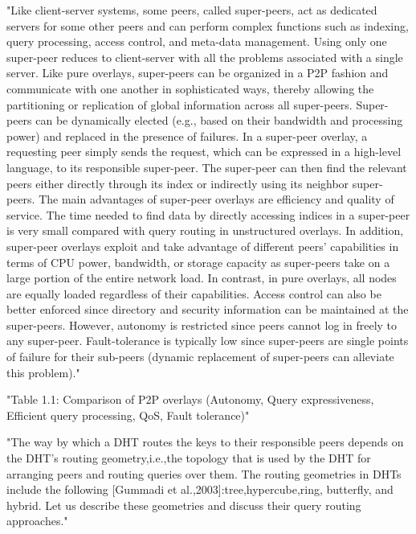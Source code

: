 "Like client-server systems, some peers, called super-peers, act as dedicated servers for some other peers and can perform complex functions such as indexing, query processing, access control, and meta-data management.
Using only one super-peer reduces to client-server with all the problems associated with a single server.
Like pure overlays, super-peers can be organized in a P2P fashion and communicate with one another in sophisticated ways, thereby allowing the partitioning or replication of global information across all super-peers.
Super-peers can be dynamically elected (e.g., based on their bandwidth and processing power) and replaced in the
presence of failures.
In a super-peer overlay, a requesting peer simply sends the request, which can be expressed in a high-level language, to its responsible super-peer.
The super-peer can then find the relevant peers either directly through its index or indirectly using its neighbor super-peers.
The main advantages of super-peer overlays are efficiency and quality of service.
The time needed to find data by directly accessing indices in a super-peer is very small compared with query routing in unstructured overlays.
In addition, super-peer overlays exploit and take advantage of different peers’ capabilities in terms of CPU power, bandwidth, or storage capacity as super-peers take on a large portion of the entire network load.
In contrast, in pure overlays, all nodes are equally loaded regardless of their capabilities.
Access control can also be better enforced since directory and security information can be maintained at the super-peers.
However, autonomy is restricted since peers cannot log in freely to any super-peer.
Fault-tolerance is typically low since super-peers are single points of failure for their sub-peers (dynamic replacement of super-peers can alleviate this problem)."\cite{book:p2p-mob}

"Table 1.1: Comparison of P2P overlays
(Autonomy, Query expressiveness, Efficient query processing, QoS, Fault tolerance)"\cite{book:p2p-mob}

"The way by which a DHT routes the keys to their responsible peers depends on the DHT’s routing geometry,i.e.,the topology that is used by the DHT for arranging peers and routing queries over them.
The routing geometries in DHTs include the following [Gummadi et al.,2003]:tree,hypercube,ring, butterfly, and hybrid.
Let us describe these geometries and discuss their query routing approaches."\cite{book:p2p-mob}

